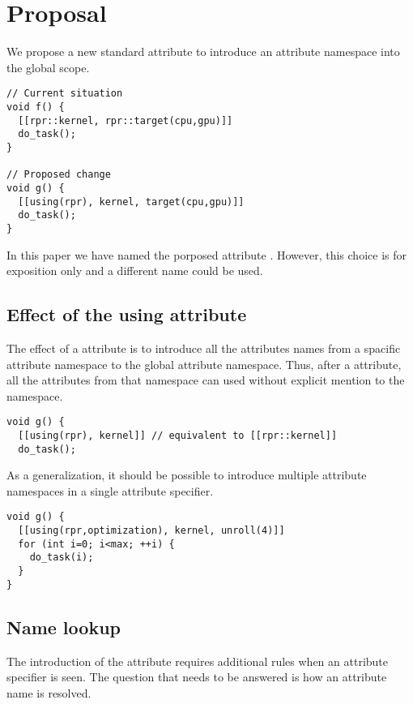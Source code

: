 \section{Proposal}

We propose a new standard attribute to introduce an attribute namespace
into the global scope.

\begin{lstlisting}
// Current situation
void f() {
  [[rpr::kernel, rpr::target(cpu,gpu)]]
  do_task();
}

// Proposed change
void g() {
  [[using(rpr), kernel, target(cpu,gpu)]]
  do_task();
}
\end{lstlisting}

In this paper we have named the porposed attribute . However,
this choice is for exposition only and a different name could be used.

\subsection{Effect of the using attribute}

The effect of a  attribute is to introduce all the attributes
names from a spacific attribute namespace to the global attribute namespace.
Thus, after a  attribute, all the attributes from that namespace
can used without explicit mention to the namespace.

\begin{lstlisting}
void g() {
  [[using(rpr), kernel]] // equivalent to [[rpr::kernel]]
  do_task();
\end{lstlisting}

As a generalization, it should be possible to introduce multiple attribute
namespaces in a single attribute specifier.

\begin{lstlisting}
void g() {
  [[using(rpr,optimization), kernel, unroll(4)]]
  for (int i=0; i<max; ++i) {
    do_task(i);
  }
}
\end{lstlisting}

\subsection{Name lookup}

The introduction of the  attribute requires additional
rules when an attribute specifier is seen. The question that needs to
be answered is how an attribute name is resolved.

